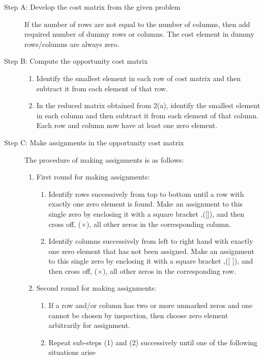 \begin{description}
	\item [Step A:  Develop the cost matrix from the given problem] If the number of rows are not equal to the number of columns, then add required number of dummy rows or columns. The cost element in dummy rows/columns are always zero.
	\item [Step B:  Compute the opportunity cost matrix]
		\begin{enumerate}
			\item  Identify the smallest element in each row of cost matrix and then subtract it from each element of that row.
			\item  In the reduced matrix obtained from 2(a), identify the smallest element in each column and then subtract
			it from each element of that column. Each row and column now have at least one zero element.
		\end{enumerate}
	\item [Step C:  Make assignments in the opportunity cost matrix] The procedure of making assignments is as follows:
		\begin{enumerate}
			\item First round for making assignments:
				\begin{enumerate}
					\item Identify rows successively from top to bottom until a row with exactly one zero element is found. Make an assignment to this single zero by enclosing it with a square bracket ,([]), and then cross off, ($\times$), all
					other zeros in the corresponding column.
					\item Identify columns successively from left to right hand with exactly one zero element that has not
					been assigned. Make an assignment to this single zero by enclosing it with a square bracket ,([ ]), and then cross off, ($\times$), all other zeros in the corresponding row.
				\end{enumerate}
			\item Second round for making assignments:
				\begin{enumerate}
					\item If a row and/or column has two or more unmarked zeros and one cannot be chosen by inspection, then choose zero element arbitrarily for assignment.
					\item Repeat sub-steps (1) and (2) successively until one of the following situations arise
				\end{enumerate}
		\end{enumerate}

\end{description}
